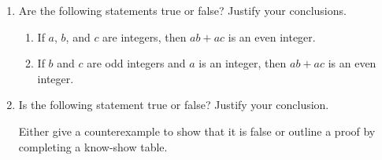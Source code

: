 \begin{enumerate}
\begin{enumerate}
  \end{enumerate}


%


\item Are the following statements true or false?  Justify your conclusions. \label{exer:sec12-new7}
\begin{enumerate}
  \item If $a$, $b$, and $c$ are integers, then $ab + ac$ is an even integer.
  \item If $b$ and $c$ are odd integers and $a$ is an integer, then $ab + ac$ is an even integer.
\end{enumerate}





\item \label{exer:sec12-8}%
Is the following statement true or false?  Justify your conclusion.
 
Either give a counterexample to show that it is false or outline a proof by completing a know-show table.

%
%
%


\end{enumerate}
